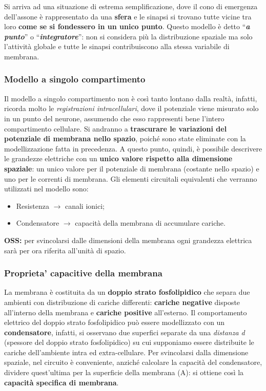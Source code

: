 Si arriva ad una situazione di estrema semplificazione, dove il cono di emergenza dell'assone è rappresentato da una \textbf{sfera }e le sinapsi si trovano tutte vicine tra loro \textbf{come se si fondessero in un unico punto}. Questo modello è detto ``\textbf{\textit{a}}\textbf{\textit{ }}\textbf{\textit{punto}}'' o ``\textbf{\textit{integratore}}'': non si considera più la distribuzione spaziale ma solo l'attività globale e tutte le sinapsi contribuiscono alla stessa variabile di membrana.

\subsubsection{Modello a singolo compartimento}

Il modello a singolo compartimento non è così tanto lontano dalla realtà, infatti, ricorda molto le \textit{registrazioni intracellulari}, dove il potenziale viene misurato solo in un punto del neurone, assumendo che esso rappresenti bene l'intero compartimento cellulare.
Si andranno a \textbf{trascurare le variazioni del potenziale di membrana nello spazio}, poiché sono state eliminate con la modellizzazione fatta in precedenza. A questo punto, quindi, è possibile descrivere le grandezze elettriche con un \textbf{unico valore rispetto alla dimensione spaziale}: un unico valore per il potenziale di membrana (costante nello spazio) e uno per le correnti di membrana.
Gli elementi circuitali equivalenti che verranno utilizzati nel modello sono:

\begin{itemize}
  \item Resistenza $\rightarrow$ canali ionici;
  \item Condensatore $\rightarrow$ capacità della membrana di accumulare cariche.
\end{itemize}
\textbf{OSS: }per svincolarsi dalle dimensioni della membrana ogni grandezza elettrica sarà per ora riferita all'unità di spazio.

\subsubsection{Proprieta' capacitive della membrana}

La membrana è costituita da un \textbf{doppio strato fosfolipidico }che separa due ambienti con distribuzione di cariche differenti: \textbf{cariche negative }disposte all'interno della membrana e \textbf{cariche positive }all'esterno.
Il comportamento elettrico del doppio strato fosfolipidico può essere modellizzato con un \textbf{condensatore}, infatti, si osservano due superfici separate da una \textit{distanza d }(spessore del doppio strato fosfolipidico) su cui supponiamo essere distribuite le cariche dell'ambiente intra ed extra-cellulare.
Per svincolarsi dalla dimensione spaziale, nel circuito è conveniente, anziché calcolare la capacità del condensatore, dividere quest'ultima per la superficie della membrana (A): si ottiene così la \textbf{capacità specifica di membrana}.

